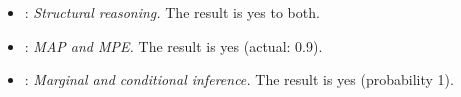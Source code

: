\begingroup\footnotesize\raggedright
\begin{itemize}[nosep,leftmargin=*]
\item {}: \emph{Structural reasoning.}  The result is yes to both.
\item {}: \emph{MAP and MPE.}  The result is yes (actual: 0.9).
\item {}: \emph{Marginal and conditional inference.}  The result is yes (probability 1).
\end{itemize}
\endgroup
